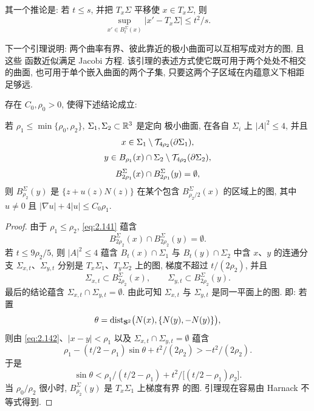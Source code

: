 其一个推论是: 若 $t\leq s$, 并把 $T_x\Sigma$ 平移使 $x\in T_x\Sigma$, 则
\begin{equation}
\sup_{x'\in B_t^{\Sigma}(x)}|x'-T_x\Sigma|\leq t^{2}/s.
\label{eq:2.142}
\end{equation}

下一个引理说明: 两个曲率有界、彼此靠近的极小曲面可以互相写成对方的图, 且这些
函数近似满足 Jacobi 方程. 该引理的表述方式使它既可用于两个处处不相交的曲面,
也可用于单个嵌入曲面的两个子集, 只要这两个子区域在内蕴意义下相距足够远.

\begin{lemma}
\label{lem:2.30}
存在 $C_0,\rho_0>0$, 使得下述结论成立:

若 $\rho_1\leq\min\{\rho_0,\rho_2\}$, $\Sigma_1,\Sigma_2\subset\mathbb{R}^3$ 是定向
极小曲面, 在各自 $\Sigma_i$ 上 $|A|^{2}\leq4$, 并且
\begin{gather*}
x\in\Sigma_1\setminus\mathcal{T}_{4\rho_2}(\partial\Sigma_1),\\[3pt]
y\in B_{\rho_1}(x)\cap\Sigma_2\setminus\mathcal{T}_{4\rho_2}(\partial\Sigma_2),\\[3pt]
B_{2\rho_1}^{\Sigma}(x)\cap B_{2\rho_1}^{\Sigma}(y)=\emptyset,
\end{gather*}
则 $B_{\rho_2}^{\Sigma}(y)$ 是 $\{z+u(z)N(z)\}$ 在某个包含
$B_{\rho_2/2}^{\Sigma}(x)$ 的区域上的图, 其中 $u\neq0$ 且
$|\nabla u|+4|u|\leq C_0\rho_1$.
\end{lemma}

\begin{proof}
由于 $\rho_1\leq\rho_2$, \eqref{eq:2.141} 蕴含
\[
B_{2\rho_2}^{\Sigma}(x)\cap B_{2\rho_2}^{\Sigma}(y)=\emptyset.
\]
若 $t\leq9\rho_2/5$, 则 $|A|^{2}\leq4$ 蕴含 $B_t(x)\cap\Sigma_1$ 与
$B_t(y)\cap\Sigma_2$ 中含 $x$、$y$ 的连通分支 $\Sigma_{x,t}$、$\Sigma_{y,t}$
分别是 $T_x\Sigma_1$、$T_y\Sigma_2$ 上的图, 梯度不超过 $t/(2\rho_2)$, 并且
\[
\Sigma_{x,t}\subset B_{2\rho_2}^{\Sigma}(x),\qquad
\Sigma_{y,t}\subset B_{2\rho_2}^{\Sigma}(y).
\]
最后的结论蕴含 $\Sigma_{x,t}\cap\Sigma_{y,t}=\emptyset$. 由此可知
$\Sigma_{x,t}$ 与 $\Sigma_{y,t}$ 是同一平面上的图. 即: 若置
\[
\theta=\operatorname{dist}_{\mathbf{S}^{2}}\bigl(N(x),\{N(y),-N(y)\}\bigr),
\]
则由 \eqref{eq:2.142}、$|x-y|<\rho_1$ 以及 $\Sigma_{x,t}\cap\Sigma_{y,t}=\emptyset$
蕴含
\begin{equation}
\rho_1-(t/2-\rho_1)\sin\theta+t^{2}/(2\rho_2)>-t^{2}/(2\rho_2).
\label{eq:2.143}
\end{equation}
于是
\[
\sin\theta<\rho_1/(t/2-\rho_1)
 +t^{2}\bigl/[(t/2-\rho_1)\rho_2\bigr].
\]
当 $\rho_0/\rho_2$ 很小时, $B_{\rho_2}^{\Sigma}(y)$ 是 $T_x\Sigma_1$ 上梯度有界
的图. 引理现在容易由 Harnack 不等式得到.
\end{proof}

